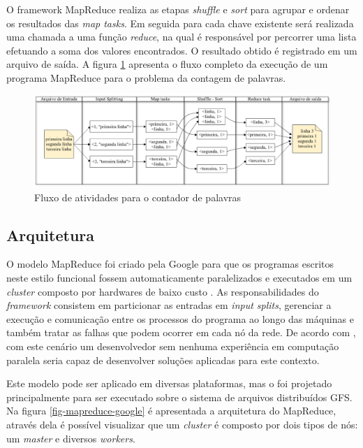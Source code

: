 O framework MapReduce realiza as etapas \textit{shuffle} e \textit{sort} para agrupar e ordenar os resultados das \textit{map tasks}. Em seguida para cada chave existente será realizada uma chamada a uma função \textit{reduce}, na qual é responsável por percorrer uma lista efetuando a soma dos valores encontrados. O resultado obtido é registrado em um arquivo de saída. A figura \ref{fig-mapreduce-word-count} apresenta o fluxo completo da execução de um programa MapReduce para o problema da contagem de palavras.

\begin{figure}[ht!]
	\centering
	\includegraphics[keepaspectratio=true,scale=0.4]
	  {figuras/mapreduce-word-count.eps}
	\caption{Fluxo de atividades para o contador de palavras}
	\label{fig-mapreduce-word-count}
\end{figure}

\subsection{Arquitetura}

O modelo MapReduce foi criado pela Google para que os programas escritos neste estilo funcional fossem automaticamente paralelizados e executados em um \textit{cluster} composto por hardwares de baixo custo \cite{ghemawatMapreduce2008}. As responsabilidades do \textit{framework} consistem em particionar as entradas em \textit{input splits}, gerenciar a execução e comunicação entre os processos do programa ao longo das máquinas e também tratar as falhas que podem ocorrer em cada nó da rede. De acordo com , com este cenário um desenvolvedor sem nenhuma experiência em computação paralela seria capaz de desenvolver soluções aplicadas para este contexto. 

Este modelo pode ser aplicado em diversas plataformas, mas o foi projetado principalmente para ser executado sobre o sistema de arquivos distribuídos GFS. Na figura \ref{fig-mapreduce-google} é apresentada a arquitetura do MapReduce, através dela é possível visualizar que um \textit{cluster} é composto por dois tipos de nós: um \textit{master} e diversos \textit{workers}.

